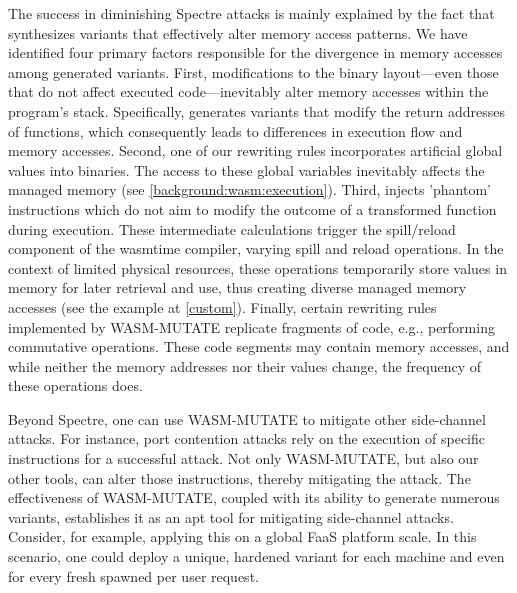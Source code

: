 \begin{strategy}
    The success in diminishing Spectre attacks is mainly explained by the fact that \tool synthesizes variants that effectively alter memory access patterns. 
    We have identified four primary factors responsible for the divergence in memory accesses among \tool generated variants.
    First, modifications to the binary layout—even those that do not affect executed code—inevitably alter memory accesses within the program's stack. 
    Specifically, \tool generates variants that modify the return addresses of functions, which consequently leads to differences in execution flow and memory accesses.
    Second, one of our rewriting rules incorporates artificial global values into \Wasm binaries. 
    The access to these global variables inevitably affects the managed memory (see \autoref{background:wasm:execution}).
    Third, \tool injects 'phantom' instructions which do not aim to modify the outcome of a transformed function during execution. 
    These intermediate calculations trigger the spill/reload component of the wasmtime compiler, varying spill and reload operations. 
    In the context of limited physical resources, these operations temporarily store values in memory for later retrieval and use, thus creating diverse managed memory accesses (see the example at \autoref{custom}).
    Finally, certain rewriting rules implemented by WASM-MUTATE replicate fragments of code, e.g., performing commutative operations. 
    These code segments may contain memory accesses, and while neither the memory addresses nor their values change, the frequency of these operations does.
\end{strategy}



\begin{tcolorbox}[title=Reflection,boxrule=1pt,arc=.2em,boxsep=1.0mm]

    Beyond Spectre, one can use WASM-MUTATE to mitigate other side-channel attacks. 
    For instance, port contention attacks \cite{10.1145/3488932.3517411} rely on the execution of specific instructions for a successful attack. 
    Not only WASM-MUTATE, but also our other tools, can alter those instructions, thereby mitigating the attack. 
    The effectiveness of WASM-MUTATE, coupled with its ability to generate numerous variants, establishes it as an apt tool for mitigating side-channel attacks. 
    Consider, for example, applying this on a global FaaS platform scale. 
    In this scenario, one could deploy a unique, hardened variant for each machine and even for every fresh \Wasm spawned per user request.

\end{tcolorbox}


